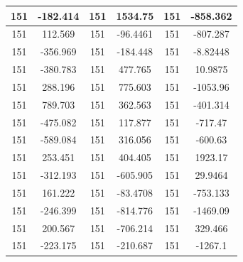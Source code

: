 \documentclass{article}
\begin{document}
\begin{tabular}{cccccc}
151&-182.414&151&1534.75&151&-858.362 \\ \hline
151&112.569&151&-96.4461&151&-807.287 \\ \hline
151&-356.969&151&-184.448&151&-8.82448 \\ \hline
151&-380.783&151&477.765&151&10.9875 \\ \hline
151&288.196&151&775.603&151&-1053.96 \\ \hline
151&789.703&151&362.563&151&-401.314 \\ \hline
151&-475.082&151&117.877&151&-717.47 \\ \hline
151&-589.084&151&316.056&151&-600.63 \\ \hline
151&253.451&151&404.405&151&1923.17 \\ \hline
151&-312.193&151&-605.905&151&29.9464 \\ \hline
151&161.222&151&-83.4708&151&-753.133 \\ \hline
151&-246.399&151&-814.776&151&-1469.09 \\ \hline
151&200.567&151&-706.214&151&329.466 \\ \hline
151&-223.175&151&-210.687&151&-1267.1 \\ \hline
\end{tabular}
\end{document}
